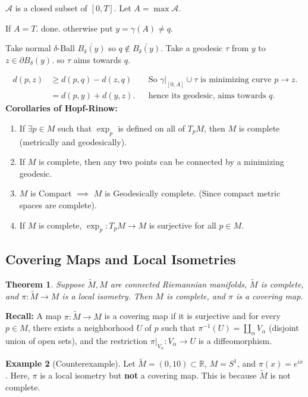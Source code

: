 \documentclass[11pt, a4paper]{article}
\theoremstyle{plain}
\newtheorem{theorem}{Theorem}[section]
\theoremstyle{definition}
\newtheorem{example}[theorem]{Example}
\theoremstyle{remark}
\begin{document}
{\noindent $\mathcal{A}$ is a closed subset of $[0, T]$. Let $A = \max \mathcal{A}$.

\noindent If $A = T$. done. otherwise put $y = \gamma(A) \neq q$.

\noindent Take normal $\delta$-Ball $\overline{B_\delta(y)}$ so $q \notin \overline{B_\delta(y)}$. Take a geodesic $\tau$ from $y$ to $z \in \partial B_\delta(y)$. so $\tau$ aims towards $q$.

\begin{align*}
d(p, z) &\ge d(p, q) - d(z, q) & & \text{So } \gamma|_{[0, A]} \cup \tau \text{ is minimizing curve } p \to z. \\
&= d(p, y) + d(y, z). & & \text{hence its geodesic, aims towards } q.
\end{align*}
\vspace{1em}
\noindent \textbf{Corollaries of Hopf-Rinow:}
\begin{enumerate}
    \item If $\exists p \in M$ such that $\exp_p$ is defined on all of $T_pM$, then $M$ is complete (metrically and geodesically).
    \item If $M$ is complete, then any two points can be connected by a minimizing geodesic.
    \item $M$ is Compact $\implies$ $M$ is Geodesically complete. (Since compact metric spaces are complete).
    \item If $M$ is complete, $\exp_p: T_pM \to M$ is surjective for all $p \in M$.
\end{enumerate}

\subsection{Covering Maps and Local Isometries}

\begin{theorem}
Suppose $\tilde{M}, M$ are connected Riemannian manifolds, $\tilde{M}$ is complete, and $\pi: \tilde{M} \to M$ is a local isometry. Then $M$ is complete, and $\pi$ is a covering map.
\end{theorem}

\noindent \textbf{Recall:} A map $\pi: \tilde{M} \to M$ is a covering map if it is surjective and for every $p \in M$, there exists a neighborhood $U$ of $p$ such that $\pi^{-1}(U) = \coprod_\alpha V_\alpha$ (disjoint union of open sets), and the restriction $\pi|_{V_\alpha}: V_\alpha \to U$ is a diffeomorphism.

\begin{example}[Counterexample]
Let $\tilde{M} = (0, 10) \subset \mathbb{R}$, $M = S^1$, and $\pi(x) = e^{ix}$. Here, $\pi$ is a local isometry but \textbf{not} a covering map. This is because $\tilde{M}$ is not complete.
\end{example}

}
\end{document}
